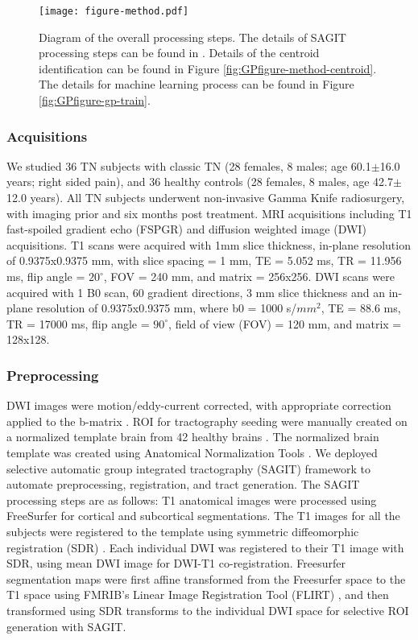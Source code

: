 \begin{figure}[ht]
\centering
\texttt{[image: figure-method.pdf]}
\caption{Diagram of the overall processing steps. The details of SAGIT processing steps can be found in \protect\cite{Chen2016}. Details of the centroid identification can be found in Figure \ref{fig:GPfigure-method-centroid}. The details for machine learning process can be found in Figure \ref{fig:GPfigure-gp-train}. }
\label{fig:GPMethods}
\end{figure}

\subsubsection{Acquisitions}
We studied 36 TN subjects with classic TN (28 females, 8 males; age 60.1$\pm$16.0 years; right sided pain), and 36 healthy controls (28 females, 8 males, age 42.7$\pm$12.0 years).  All TN subjects underwent non-invasive Gamma Knife radiosurgery, with imaging prior and six months post treatment. MRI acquisitions including T1 fast-spoiled gradient echo (FSPGR) and diffusion weighted image (DWI) acquisitions. 
T1 scans were acquired with 1mm slice thickness, in-plane resolution of 0.9375x0.9375 mm, with slice spacing = 1 mm, TE = 5.052 ms, TR = 11.956 ms, flip angle = $20^\circ$, FOV = 240 mm, and matrix = 256x256. 
DWI scans were acquired with 1 B0 scan, 60 gradient directions, 3 mm slice thickness and an in-plane resolution of 0.9375x0.9375 mm, where b0 = 1000 s/$mm^2$, TE = 88.6 ms, TR = 17000 ms, flip angle = $90^\circ$, field of view (FOV) = 120 mm, and matrix = 128x128.

\subsubsection{Preprocessing}
DWI images were motion/eddy-current corrected, with appropriate correction applied to the b-matrix \cite{Leemans2009}. ROI for tractography seeding were manually created on a normalized template brain from 42 healthy brains \cite{Chen2016}. The normalized brain template was created using Anatomical Normalization Tools \cite{Avants2010,Avants2011}. We deployed selective automatic group integrated tractography (SAGIT) framework \cite{Chen2016} to automate preprocessing, registration, and tract generation. The SAGIT processing steps are as follows: T1 anatomical images were processed using FreeSurfer \cite{Fischl2004} for cortical and subcortical segmentations. The T1 images for all the subjects were registered to the template using symmetric diffeomorphic registration (SDR) \cite{Avants2008b}. Each individual DWI was registered to their T1 image with SDR, using mean DWI image for DWI-T1 co-registration. Freesurfer segmentation maps were first affine transformed from the Freesurfer space to the T1 space using FMRIB's Linear Image Registration Tool (FLIRT) \cite{Jenkinson2001,Jenkinson2002}, and then transformed using SDR transforms to the individual DWI space for selective ROI generation with SAGIT.

